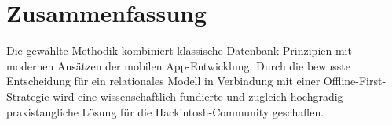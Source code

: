 \section{Zusammenfassung}
Die gewählte Methodik kombiniert klassische Datenbank-Prinzipien mit modernen Ansätzen der mobilen App-Entwicklung. Durch die bewusste Entscheidung für ein relationales Modell in Verbindung mit einer Offline-First-Strategie wird eine wissenschaftlich fundierte und zugleich hochgradig praxistaugliche Lösung für die Hackintosh-Community geschaffen.